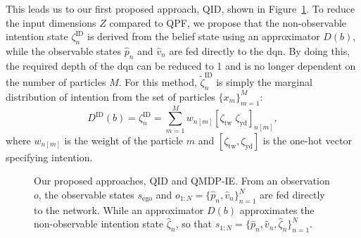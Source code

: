 This leads us to our first proposed approach, QID, shown in Figure~\ref{fig:qid}. To reduce the input dimensions $Z$ compared to QPF, we propose that the non-observable intention state $\zeta^\mathrm{ID}_n$ is derived from the belief state using an approximator $D(b)$, while the observable states $\hat{p}_n$ and $\hat{v}_n$ are fed directly to the \gls{dqn}. By doing this, the required depth of the \gls{dqn} can be reduced to 1 and is no longer dependent on the number of particles $M$. 
For this method, $\tilde{\zeta}^\mathrm{ID}_n$ is simply the marginal distribution of intention from the set of particles $\{ x_m \}^M_{m=1}$: 
\begin{equation}
    D^\mathrm{ID}(b) = \zeta^\mathrm{ID}_n = \sum_{m=1}^M w_{n[m]} [\zeta_\text{tw} \; \zeta_\text{yd}]_{n[m]},
    \label{eq:ID_i}
\end{equation}
where $w_{n[m]}$ is the weight of the particle $m$ and $[\zeta_\text{tw} , \zeta_\text{yd}]$ is the one-hot vector specifying intention. 

\begin{figure}[!h]
    \centering
        
        \caption{Our proposed approaches, QID and QMDP-IE. From an observation $o$, the observable states $s_\mathrm{ego}$ and $o_{1:N}=\{\hat{p}_n, \hat{v}_n\}_{n=1}^N$ are fed directly to the network. While an approximator $D(b)$ approximates the non-observable intention state $\hat \zeta_n$, so that $s_{1:N}=\{\hat p_n, \hat v_n, \hat \zeta_n \}^N_{n=1}$.
        }
    \label{fig:qid}
\end{figure}

